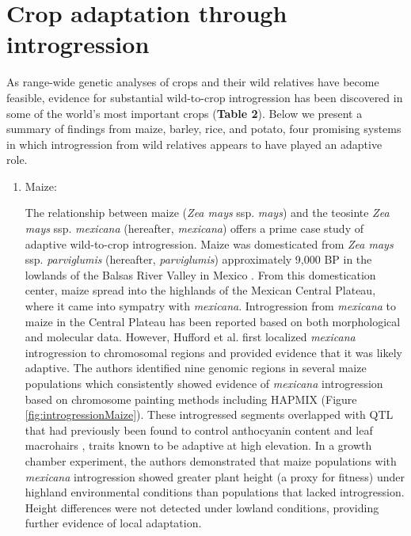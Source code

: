 \documentclass[11pt]{article}
\begin{document}
\section*{Crop adaptation through introgression}

As range-wide genetic analyses of crops and their wild relatives have become feasible, evidence for substantial wild-to-crop introgression has been discovered in some of the world's most important crops (\textbf{Table 2}).
Below we present a summary of findings from maize, barley, rice, and potato, four promising systems in which introgression from wild relatives appears to have played an adaptive role.

\begin{enumerate}
\item{Maize:}

The relationship between maize (\emph{Zea mays} ssp. \emph{mays}) and the teosinte \emph{Zea mays} ssp. \emph{mexicana} (hereafter, \emph{mexicana}) offers a prime case study of adaptive wild-to-crop introgression.
Maize was domesticated from \emph{Zea mays} ssp. \emph{parviglumis} (hereafter, \emph{parviglumis})  approximately 9,000 BP in the lowlands of the Balsas River Valley in Mexico \cite{matsuoka2002single}.
From this domestication center, maize spread into the highlands of the Mexican Central Plateau, where it came into sympatry with \emph{mexicana}.
Introgression from \emph{mexicana} to maize in the Central Plateau has been reported based on both morphological \cite {wilkes1977} and molecular \cite{vanHeerwaarden2011, doebley1987} data.
However, Hufford et al. \cite{Hufford2013} first localized \emph{mexicana} introgression to chromosomal regions and provided evidence that it was likely adaptive.
The authors identified nine genomic regions in several maize populations which consistently showed evidence of \emph{mexicana} introgression based on chromosome painting methods including HAPMIX (Figure \ref{fig:introgressionMaize}).
These introgressed segments overlapped with QTL that had previously been found to control anthocyanin content and leaf macrohairs \cite{lauter2004}, traits known to be adaptive at high elevation.
In a growth chamber experiment, the authors demonstrated that maize populations with \emph{mexicana} introgression showed greater plant height (a proxy for fitness) under highland environmental conditions than populations that lacked introgression.
Height differences were not detected under lowland conditions, providing further evidence of local adaptation.



\end{enumerate}
\end{document}
